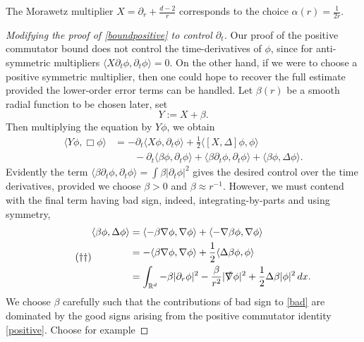 \begin{remark}
	The Morawetz multiplier $X = \partial_r + \tfrac{d - 2}{r}$ corresponds to the choice $\alpha(r) = \tfrac1{2r}$. 
\end{remark}

\begin{proof}[Modifying the proof of \eqref{boundpositive} to control $\partial_t$]
	Our proof of the positive commutator bound does not control the time-derivatives of $\phi$, since for anti-symmetric multipliers $\langle X \partial_t \phi, \partial_t \phi \rangle = 0$. On the other hand, if we were to choose a positive symmetric multiplier, then one could hope to recover the full estimate provided the lower-order error terms can be handled. Let $\beta(r)$ be a smooth radial function to be chosen later, set
		\[
			Y := X + \beta. 
		\]
	Then multiplying the equation by $Y\phi$, we obtain 
		\begin{align*}
			\langle Y \phi, \Box \phi \rangle 
				&= - \partial_t \langle X \phi, \partial_t \phi \rangle + \frac12 \langle [X, \Delta] \phi, \phi \rangle \\
				&\qquad - \partial_t \langle \beta \phi, \partial_t \phi \rangle + \langle \beta \partial_t \phi, \partial_t \phi \rangle + \langle \beta \phi, \Delta \phi \rangle. 
		\end{align*}
	Evidently the term $\langle \beta \partial_t \phi, \partial_t \phi \rangle = \int \beta |\partial_t \phi|^2$ gives the desired control over the time derivatives, provided we choose $\beta > 0$ and $\beta \approx r^{-1}$. However, we must contend with the final term having bad sign, indeed, integrating-by-parts and using symmetry, 
		\begin{equation}\tag{$\dagger \dagger$}\label{eq:bad}
		\begin{split}
			\langle \beta \phi, \Delta \phi \rangle 
				&= \langle - \beta \nabla \phi, \nabla \phi \rangle + \langle - \nabla \beta \phi, \nabla \phi \rangle \\
				&= -\langle  \beta \nabla \phi, \nabla \phi \rangle + \frac12 \langle \Delta \beta \phi,  \phi \rangle \\
				&=  \int_{\mathbb R^d} -\beta |\partial_r \phi|^2 - \frac{\beta}{r^2} |\slashed \nabla \phi|^2 + \frac12 \Delta \beta |\phi|^2 \, dx. 
		\end{split}
		\end{equation}
	We choose $\beta$ carefully such that the contributions of bad sign to \eqref{bad} are dominated by the good signs arising from the positive commutator identity \eqref{positive}. Choose for example

\end{proof}

